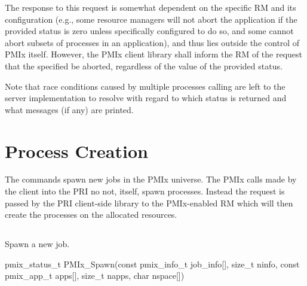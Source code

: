 \adviceuserstart
The response to this request is somewhat dependent on the specific \acl{RM} and its configuration (e.g., some resource managers will not abort the application if the provided status is zero unless specifically configured to do so, and some cannot abort subsets of processes in an application), and thus lies outside the control of PMIx itself.
However, the PMIx client library shall inform the \ac{RM} of the request that the specified  be aborted, regardless of the value of the provided status.

Note that race conditions caused by multiple processes calling  are left to the server implementation to resolve with regard to which status is returned and what messages (if any) are printed.
\adviceuserend


\section{Process Creation}
\label{chap:api_proc_mgmt:spawn}

The  commands spawn new jobs in the \ac{PMIx} universe.
The \ac{PMIx} calls made by the client into the \ac{PRI} no not, itself, spawn processes.
Instead the request is passed by the \ac{PRI} client-side library to the \ac{PMIx}-enabled \ac{RM} which will then create the processes on the allocated resources.

\subsection{}

\summary

Spawn a new job.

\format

\cspecificstart
\begin{codepar}
pmix_status_t
PMIx_Spawn(const pmix_info_t job_info[], size_t ninfo,
           const pmix_app_t apps[], size_t napps,
           char nspace[])
\end{codepar}
\cspecificend

\begin{arglist}
\end{arglist}

